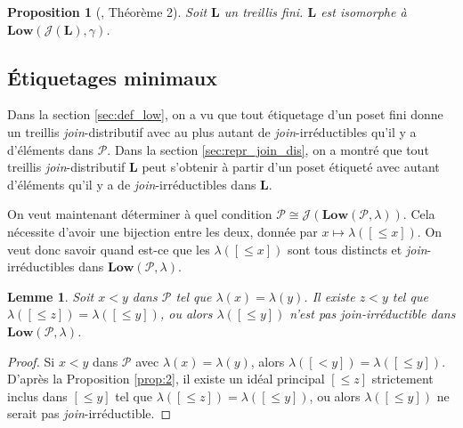 \documentclass[leqno, 12pt]{amsart}
\numberwithin{equation}{section}
\newtheorem{lem}[thm]{Lemme}
\newtheorem{prop}[thm]{Proposition}
\renewcommand{\L}{\mathbf L}
\newcommand{\Pos}{\mathcal P}
\newcommand{\JIrr}{\mathcal J}
\newcommand{\IdL}{\mathbf{Low}}
\begin{document}
\begin{prop}[\cite{HaNo18}, Théorème 2]
  Soit $\L$ un treillis fini. $\L$ est isomorphe à $\IdL(\JIrr(\L),\gamma)$.
\end{prop}

\subsection{Étiquetages minimaux}
\label{sec:min_label}
Dans la section \ref{sec:def_low}, on a vu que tout étiquetage d'un poset fini donne un treillis \emph{join}-distributif avec au plus autant de \emph{join}-irréductibles qu'il y a d'éléments dans $\Pos$.
Dans la section \ref{sec:repr_join_dis}, on a montré que tout treillis \emph{join}-distributif $\L$ peut s'obtenir à partir d'un poset étiqueté avec autant d'éléments qu'il y a de \emph{join}-irréductibles dans $\L$. 

On veut maintenant déterminer à quel condition $\Pos\cong \JIrr(\IdL(\Pos,\lambda))$. Cela nécessite d'avoir une bijection entre les deux, donnée par $x\mapsto \lambda([\le x])$. On veut donc savoir quand est-ce que les $\lambda([\le x])$ sont tous distincts et \emph{join}-irréductibles dans $\IdL(\Pos, \lambda)$.

\begin{lem}
   \label{lem:comparable_elem}
   Soit $x<y$ dans $\Pos$ tel que $\lambda(x)=\lambda(y)$. Il existe $z<y$ tel que $\lambda([\le z])=\lambda([\le y])$, ou alors $\lambda([\le y])$ n'est pas \emph{join}-irréductible dans $\IdL(\Pos,\lambda)$.
\end{lem}
\begin{proof}
   Si $x<y$ dans $\Pos$ avec $\lambda(x)=\lambda(y)$, alors $\lambda([< y])=\lambda([\le y])$. D'après la Proposition \ref{prop:2}, il existe un idéal principal $[\le z]$ strictement inclus dans $[\le y]$ tel que $\lambda([\le z])=\lambda([\le y])$, ou alors $\lambda([\le y])$ ne serait pas \emph{join}-irréductible.
\end{proof}
\end{document}
